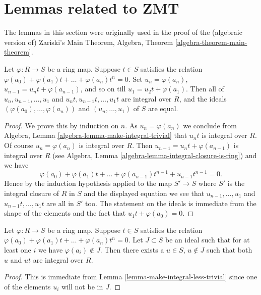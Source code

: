 \section{Lemmas related to ZMT}
\label{section-ZMT}

\noindent
The lemmas in this section were originally used in the proof of the
(algebraic version of) Zariski's Main Theorem,
Algebra, Theorem \ref{algebra-theorem-main-theorem}.

\begin{lemma}
\label{lemma-make-integral-less-trivial}
Let $\varphi : R \to S$ be a ring map.
Suppose $t \in S$ satisfies the
relation $\varphi(a_0) + \varphi(a_1)t + \ldots + \varphi(a_n) t^n = 0$.
Set $u_n = \varphi(a_n)$, $u_{n-1} = u_n t + \varphi(a_{n-1})$,
and so on till $u_1 = u_2 t + \varphi(a_1)$.
Then all of $u_n, u_{n-1}, \ldots, u_1$ and
$u_nt, u_{n-1}t, \ldots, u_1t$ are integral over $R$,
and the ideals $(\varphi(a_0), \ldots, \varphi(a_n))$ and
$(u_n, \ldots, u_1)$ of $S$ are equal.
\end{lemma}

\begin{proof}
We prove this by induction on $n$. As $u_n = \varphi(a_n)$ we
conclude from
Algebra, Lemma \ref{algebra-lemma-make-integral-trivial}
that $u_nt$ is integral over $R$. Of course
$u_n = \varphi(a_n)$ is integral over $R$. Then
$u_{n - 1} = u_n t  + \varphi(a_{n - 1})$ is integral over $R$ (see
Algebra, Lemma \ref{algebra-lemma-integral-closure-is-ring})
and we have
$$
\varphi(a_0) + \varphi(a_1)t + \ldots + \varphi(a_{n - 1})t^{n - 1} +
u_{n - 1}t^{n - 1} = 0.
$$
Hence by the induction hypothesis applied to the map
$S' \to S$ where $S'$ is the integral closure of $R$ in $S$
and the displayed equation we see that
$u_{n-1}, \ldots, u_1$ and $u_{n-1}t, \ldots, u_1t$
are all in $S'$ too. The statement on the ideals is immediate from the
shape of the elements and the fact that $u_1t + \varphi(a_0) = 0$.
\end{proof}

\begin{lemma}
\label{lemma-make-integral-not-in-ideal}
Let $\varphi : R \to S$ be a ring map.
Suppose $t \in S$ satisfies the
relation $\varphi(a_0) + \varphi(a_1)t + \ldots + \varphi(a_n) t^n = 0$.
Let $J \subset S$ be an ideal such that for at
least one $i$ we have $\varphi(a_i) \not \in J$.
Then there exists a $u \in S$, $u \not\in J$ such
that both $u$ and $ut$ are integral over $R$.
\end{lemma}

\begin{proof}
This is immediate from Lemma \ref{lemma-make-integral-less-trivial}
since one of the elements $u_i$ will not be in $J$.
\end{proof}

